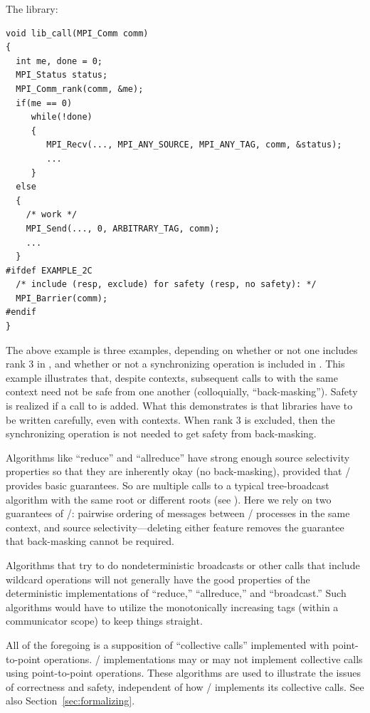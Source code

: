 \begin{example}
\noindent The library:
\begin{lstlisting}[language={[MPI]C}]
void lib_call(MPI_Comm comm)
{
  int me, done = 0;
  MPI_Status status; 
  MPI_Comm_rank(comm, &me);
  if(me == 0)
     while(!done)
     {
        MPI_Recv(..., MPI_ANY_SOURCE, MPI_ANY_TAG, comm, &status);
        ...
     }
  else
  {
    /* work */
    MPI_Send(..., 0, ARBITRARY_TAG, comm);
    ...
  }
#ifdef EXAMPLE_2C
  /* include (resp, exclude) for safety (resp, no safety): */
  MPI_Barrier(comm);
#endif
}
\end{lstlisting}
The above example is three examples, depending on whether or
not one includes rank 3 in , and whether or not a
synchronizing operation is included in . This example illustrates
that, despite contexts, subsequent calls to  with the
same context need not be safe from one another (colloquially,
``back-masking''). Safety is realized if a call to  is
added. What this demonstrates is that libraries have to be written
carefully, even with contexts. When rank 3 is excluded, then
the synchronizing operation is not needed to get safety from
back-masking.

Algorithms like ``reduce'' and ``allreduce'' have strong enough source
selectivity properties so that they are inherently okay (no
back-masking),
provided that \MPI/ provides basic guarantees. So are multiple calls to a
typical tree-broadcast algorithm with the same root or different roots
(see \cite{Skj93b}).
Here we rely on two guarantees of \MPI/: pairwise ordering of
messages between \MPI/ processes in the same context, and source
selectivity---deleting either feature removes the guarantee that
back-masking cannot
be required.

Algorithms that try to do nondeterministic broadcasts or other calls that
include wildcard operations will not generally have the good properties of the
deterministic implementations of ``reduce,'' ``allreduce,'' and ``broadcast.''
Such algorithms would have to utilize the monotonically increasing tags
(within a communicator scope) to keep things straight.

All of the foregoing is a supposition of ``collective calls'' implemented with
point-to-point operations. \MPI/ implementations may or may not implement
collective calls using point-to-point operations. These algorithms are used
to illustrate the issues of correctness and safety, independent of how \MPI/
implements its collective calls. See also Section~\ref{sec:formalizing}.
\end{example}

